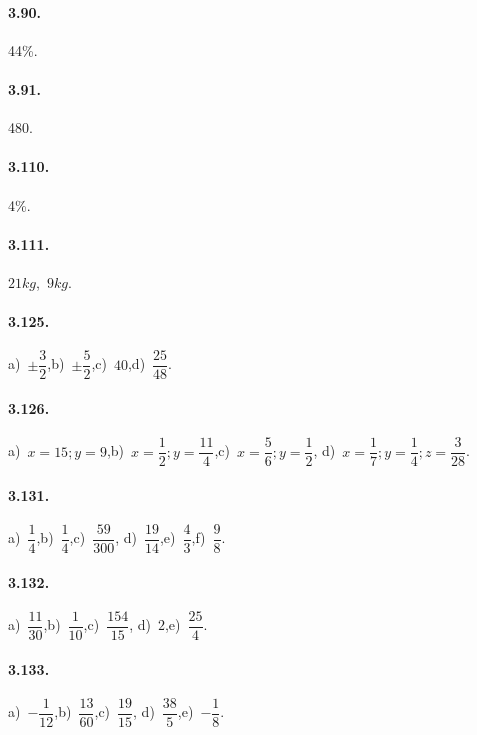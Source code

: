 \begin{multicols}{2}
\paragraph{3.90.} 44\%.

\paragraph{3.91.} 480.

\paragraph{3.110.} 4\%.

\paragraph{3.111.}
$21\unit{kg}$,~$9\unit{kg}$.

\paragraph{3.125.}
a)~$\pm\dfrac{3}{2}$,\quad b)~$\pm\dfrac{5}{2}$,\quad c)~$40$,\quad d)~$\dfrac{25}{48}$.

\paragraph{3.126.}
a)~$x=15; y=9$,\quad b)~$x=\dfrac{1}{2}; y=\dfrac{11}{4}$,\quad c)~$x=\dfrac{5}{6}; %
y=\dfrac{1}{2}$,\quad %
d)~$x=\dfrac{1}{7}; y=\dfrac{1}{4}; z=\dfrac{3}{28}$.

\paragraph{3.131.}
a)~$\dfrac{1}{4}$,\quad b)~$\dfrac{1}{4}$,\quad c)~$\dfrac{59}{300}$,\quad %
d)~$\dfrac{19}{14}$,\quad e)~$\dfrac{4}{3}$,\quad f)~$\dfrac{9}{8}$.

\paragraph{3.132.}
a)~$\dfrac{11}{30}$,\quad b)~$\dfrac{1}{10}$,\quad c)~$\dfrac{154}{15}$,\quad %
d)~$2$,\quad e)~$\dfrac{25}{4}$.

\paragraph{3.133.}
a)~$-\dfrac{1}{12}$,\quad b)~$\dfrac{13}{60}$,\quad c)~$\dfrac{19}{15}$,\quad %
d)~$\dfrac{38}{5}$,\quad e)~$-\dfrac{1}{8}$.


\end{multicols}
